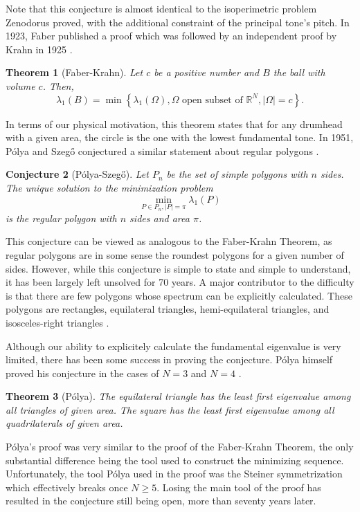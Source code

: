 \documentclass[12pt]{report}
\newtheorem{theorem}{Theorem}[section]
\newtheorem{conjecture}[theorem]{Conjecture}
\numberwithin{definition}{section}
\begin{document}
Note that this conjecture is almost identical to the isoperimetric problem Zenodorus proved, with the additional constraint of the principal tone's pitch.
In 1923, Faber published a proof which was followed by an independent proof by Krahn in 1925 \cite{krahn}.
\begin{theorem}[Faber-Krahn]
 Let $c$ be a positive number and $B$ the ball with volume $c$. Then,
 \[
   \lambda_{1}(B) = \min \left\{ \lambda_{1}(\Omega), \Omega \text{ open subset of } \mathbb{R}^{N}, |\Omega| = c \right\} 
 .\] 
\end{theorem}
In terms of our physical motivation, this theorem states that for any drumhead with a given area, the circle is the one with the lowest fundamental tone.
In 1951, Pólya and Szegő conjectured a similar statement about regular polygons \cite{polya}.

\begin{conjecture}[Pólya-Szegő]
Let $P_{n}$ be the set of simple polygons with $n$ sides.
The unique solution to the minimization problem
$$
\min_{P \in P_{n},|P|=\pi} \lambda_{1} (P)
$$
is the regular polygon with $n$ sides and area $\pi$.
\end{conjecture}

This conjecture can be viewed as analogous to the Faber-Krahn Theorem, as regular polygons are in some sense the roundest polygons for a given number of sides.
However, while this conjecture is simple to state and simple to understand, it has been largely left unsolved for 70 years.
A major contributor to the difficulty is that there are few polygons whose spectrum can be explicitly calculated.
These polygons are rectangles, equilateral triangles, hemi-equilateral triangles, and isosceles-right triangles \cite{calculate}.


Although our ability to explicitely calculate the fundamental eigenvalue is very limited, there has been some success in proving the conjecture.
Pólya himself proved his conjecture in the cases of $N = 3$ and $N = 4$ \cite{henrot}.

\begin{theorem}[Pólya]
The equilateral triangle has the least first eigenvalue among all triangles of given area.
The square has the least first eigenvalue among all quadrilaterals of given area.
\end{theorem}

Pólya's proof was very similar to the proof of the Faber-Krahn Theorem, the only substantial difference being the tool used to construct the minimizing sequence.
Unfortunately, the tool Pólya used in the proof was the Steiner symmetrization which effectively breaks once $N \geq 5$.
Losing the main tool of the proof has resulted in the conjecture still being open, more than seventy years later.
\end{document}
